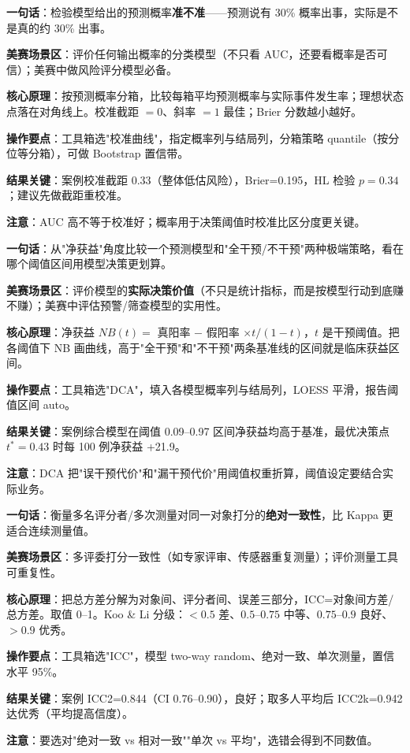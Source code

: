 \begin{algobrief}
\textbf{一句话}：检验模型给出的预测概率\textbf{准不准}——预测说有 30\% 概率出事，实际是不是真的约 30\% 出事。

\textbf{美赛场景区}：评价任何输出概率的分类模型（不只看 AUC，还要看概率是否可信）；美赛中做风险评分模型必备。

\textbf{核心原理}：按预测概率分箱，比较每箱平均预测概率与实际事件发生率；理想状态点落在对角线上。校准截距 $=0$、斜率 $=1$ 最佳；Brier 分数越小越好。

\textbf{操作要点}：工具箱选"校准曲线"，指定概率列与结局列，分箱策略 quantile（按分位等分箱），可做 Bootstrap 置信带。

\textbf{结果关键}：案例校准截距 0.33（整体低估风险），Brier=0.195，HL 检验 $p=0.34$；建议先做截距重校准。

\textbf{注意}：AUC 高不等于校准好；概率用于决策阈值时校准比区分度更关键。
\end{algobrief}


\begin{algobrief}
\textbf{一句话}：从"净获益"角度比较一个预测模型和"全干预/不干预"两种极端策略，看在哪个阈值区间用模型决策更划算。

\textbf{美赛场景区}：评价模型的\textbf{实际决策价值}（不只是统计指标，而是按模型行动到底赚不赚）；美赛中评估预警/筛查模型的实用性。

\textbf{核心原理}：净获益 $NB(t) = $ 真阳率 $-$ 假阳率 $\times t/(1-t)$，$t$ 是干预阈值。把各阈值下 NB 画曲线，高于"全干预"和"不干预"两条基准线的区间就是临床获益区间。

\textbf{操作要点}：工具箱选"DCA"，填入各模型概率列与结局列，LOESS 平滑，报告阈值区间 auto。

\textbf{结果关键}：案例综合模型在阈值 0.09--0.97 区间净获益均高于基准，最优决策点 $t^*=0.43$ 时每 100 例净获益 +21.9。

\textbf{注意}：DCA 把"误干预代价"和"漏干预代价"用阈值权重折算，阈值设定要结合实际业务。
\end{algobrief}


\begin{algobrief}
\textbf{一句话}：衡量多名评分者/多次测量对同一对象打分的\textbf{绝对一致性}，比 Kappa 更适合连续测量值。

\textbf{美赛场景区}：多评委打分一致性（如专家评审、传感器重复测量）；评价测量工具可重复性。

\textbf{核心原理}：把总方差分解为对象间、评分者间、误差三部分，ICC=对象间方差/总方差。取值 0--1。Koo \& Li 分级：$<0.5$ 差、$0.5$--$0.75$ 中等、$0.75$--$0.9$ 良好、$>0.9$ 优秀。

\textbf{操作要点}：工具箱选"ICC"，模型 two-way random、绝对一致、单次测量，置信水平 95\%。

\textbf{结果关键}：案例 ICC2=0.844（CI 0.76--0.90），良好；取多人平均后 ICC2k=0.942 达优秀（平均提高信度）。

\textbf{注意}：要选对"绝对一致 vs 相对一致""单次 vs 平均"，选错会得到不同数值。
\end{algobrief}

